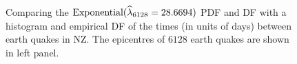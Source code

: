 \begin{figure}[htpb]
\caption{Comparing the $\mbox{{\rm Exponential}}(\widehat{\lambda}_{6128}= 28.6694)$ PDF and DF with a histogram and empirical DF of the times (in units of days) between earth quakes in  NZ.  The epicentres of $6128$ earth quakes are shown in left panel.\label{F:NZSIEarthQuakesExponentialMLE}}
\centering   {}
\end{figure}
